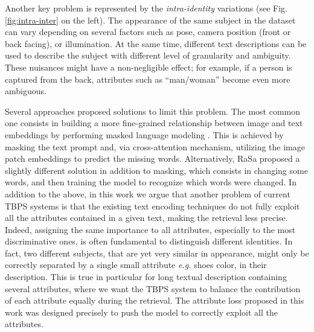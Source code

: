 \documentclass[acmsmall]{acmart}
\newcommand{\anote}[1]{\textcolor{red}{AP: #1}}
\begin{document}
Another key problem is represented by the \textit{intra-identity} variations (see Fig. \ref{fig:intra-inter} on the left). The appearance of the same subject in the dataset can vary depending on several factors such as pose, camera position (front or back facing), or illumination. At the same time, different text descriptions can be used to describe the subject with different level of granularity and ambiguity. These nuisances might have a non-negligible effect; for example, if a person is captured from the back, attributes such as ``man/woman'' become even more ambiguous. 

Several approaches proposed solutions to limit this problem. The most common one consists in building a more fine-grained relationship between image and text embeddings by performing masked language modeling \cite{jiang2023cross, lin2024cross}. This is achieved by masking the text prompt and, via cross-attention mechanism, utilizing the image patch embeddings to predict the missing words. Alternatively, RaSa \cite{bai2023rasa} proposed a slightly different solution in addition to masking, which consists in changing some words, and then training the model to recognize which words were changed.%
In addition to the above, in this work we argue that another problem of current TBPS systems is that the existing text encoding techniques do not fully exploit all the attributes contained in a given text, making the retrieval less precise. Indeed, assigning the same importance to all attributes, especially to the most discriminative ones, is often fundamental to distinguish different identities. In fact, two different subjects, that are yet very similar in appearance, might only be correctly separated by a single small attribute \textit{e.g.} shoes color, in their description. This is true in particular for long textual description containing several attributes, where we want the TBPS system to balance the contribution of each attribute equally during the retrieval.  %
The attribute loss proposed in this work was designed precisely to push the model to correctly exploit all the attributes. 
\end{document}
